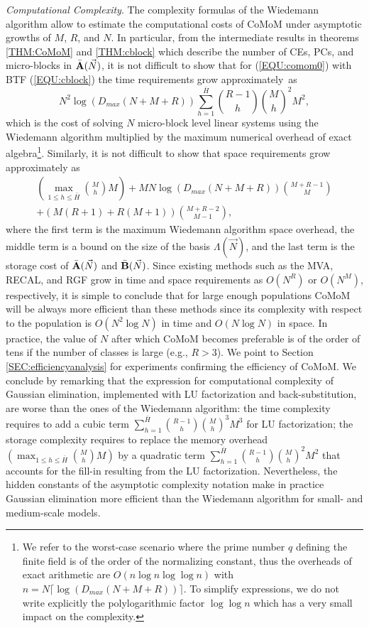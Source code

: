 \documentclass[journal,twocolumn,9.5pt]{IEEEtran}
\newcommand{\comom}[1]{\bar{#1}}
\begin{document}
{\em Computational Complexity}. The complexity formulas of the Wiedemann algorithm allow to estimate the computational costs of CoMoM under asymptotic growths of $M$, $R$, and $N$. In particular, from the intermediate results in theorems \ref{THM:CoMoM} and \ref{THM:cblock} which describe the number of CEs, PCs, and micro-blocks in $\comom{\bf A}(\vec N)$, it is not difficult to show that for (\ref{EQU:comom0}) with BTF (\ref{EQU:cblock}) the time requirements grow approximately~as $$\textstyle N^2\log(D_{max}(N+M+R))\sum_{h=1}^{\comom{H}} {R-1 \choose h} {M \choose h}^2 M^2,$$ which is the cost of solving $N$ micro-block level linear systems using the Wiedemann algorithm multiplied by the maximum numerical overhead of exact algebra\footnote{We refer to the worst-case scenario where the prime number $q$ defining the finite field is of the order of the normalizing constant, thus the overheads of exact arithmetic are $O(n \log n \log \log n)$ \cite{SchS71} with $n=N\lceil \log(D_{max}(N+M+R)) \rceil$. To simplify expressions, we do not write explicitly the polylogarithmic factor $\log \log n$ which has a very small impact on the complexity.}. Similarly, it is not difficult to show that space requirements grow approximately as
\begin{multline*}
\textstyle (\max_{1\leq h\leq \comom{H}} {M \choose h} M)+ M N\log(D_{max}(N+M+R)){M+R-1\choose M}\\ \textstyle +(M(R+1)+R(M+1)){M+R-2\choose M-1},
\end{multline*}
where the first term is the maximum Wiedemann algorithm space overhead, the middle term is a bound on the size of the basis $\Lambda(\vec N)$, and the last term is the storage cost of $\comom{\bf A}(\vec N)$ and $\comom{\bf B}(\vec N)$. Since existing methods such as the MVA, RECAL, and RGF grow in time and space requirements as $O(N^R)$ or $O(N^M)$, respectively, it is simple to conclude that for large enough populations CoMoM will be always more efficient than these methods since its complexity with respect to the population is $O(N^2\log N)$ in time and $O(N\log N)$ in space. In practice, the value of $N$ after which CoMoM becomes preferable is of the order of tens if the number of classes is large (e.g., $R> 3$). We point to Section \ref{SEC:efficiencyanalysis} for experiments confirming the efficiency of CoMoM. We conclude by remarking that the expression for computational complexity of Gaussian elimination, implemented with LU factorization and back-substitution, are worse than the ones of the Wiedemann algorithm: the time complexity requires to add a cubic term $\sum_{h=1}^{\comom{H}} {R-1 \choose h} {M \choose h}^3 M^3$ for LU factorization; the storage complexity requires to replace the memory overhead $(\max_{1\leq h\leq \comom{H}} {M \choose h} M)$ by a quadratic term $\sum_{h=1}^{\comom{H}} {R-1 \choose h} {M \choose h}^2 M^2$ that accounts for the fill-in resulting from the LU factorization. Nevertheless, the hidden constants of the asymptotic complexity notation make in practice Gaussian elimination more efficient than the Wiedemann algorithm for small- and medium-scale models.
\end{document}

